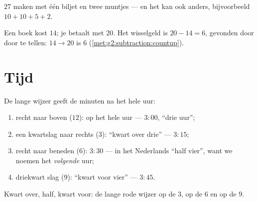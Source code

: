 \begin{omfigure}

{\small $27$ maken met één biljet en twee muntjes --- en het kan ook
anders, bijvoorbeeld $10 + 10 + 5 + 2$.}
\end{omfigure}

\begin{example}[Wisselgeld]\label{ex:g2:measure:change}
Een boek kost $14$; je betaalt met $20$. Het wisselgeld is
$20 - 14 = 6$, gevonden door door te tellen: $14 \to 20$ is $6$
(\cref{met:g2:subtraction:countup}).
\end{example}

\section{Tijd}

\begin{method}\label{met:g2:measure:clock}
De lange wijzer geeft de minuten na het hele uur:
\begin{enumerate}
  \item recht naar boven ($12$): op het hele uur --- $3{:}00$, ``drie
        uur'';
  \item een kwartslag naar rechts ($3$): ``kwart over drie'' ---
        $3{:}15$;
  \item recht naar beneden ($6$): $3{:}30$ --- in het Nederlands
        ``half vier'', want we noemen het \emph{volgende} uur;
  \item driekwart slag ($9$): ``kwart voor vier'' --- $3{:}45$.
\end{enumerate}
\end{method}

\begin{omfigure}

{\small Kwart over, half, kwart voor: de lange rode wijzer op de $3$,
op de $6$ en op de $9$.}
\end{omfigure}


